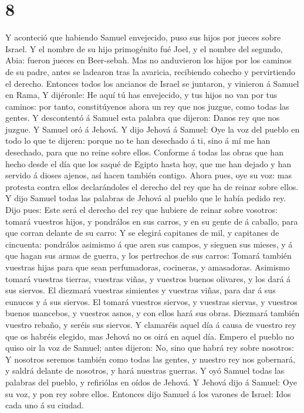 \hypertarget{section-7}{%
\section{8}\label{section-7}}

 Y aconteció que habiendo Samuel envejecido, puso sus
hijos por jueces sobre Israel.  Y el nombre de su hijo
primogénito fué Joel, y el nombre del segundo, Abia: fueron jueces en
Beer-sebah.  Mas no anduvieron los hijos por los caminos
de su padre, antes se ladearon tras la avaricia, recibiendo cohecho y
pervirtiendo el derecho.  Entonces todos los ancianos de
Israel se juntaron, y vinieron á Samuel en Rama,  Y
dijéronle: He aquí tú has envejecido, y tus hijos no van por tus
caminos: por tanto, constitúyenos ahora un rey que nos juzgue, como
todas las gentes.  Y descontentó á Samuel esta palabra que
dijeron: Danos rey que nos juzgue. Y Samuel oró á Jehová. 
Y dijo Jehová á Samuel: Oye la voz del pueblo en todo lo que te dijeren:
porque no te han desechado á ti, sino á mí me han desechado, para que no
reine sobre ellos.  Conforme á todas las obras que han
hecho desde el día que los saqué de Egipto hasta hoy, que me han dejado
y han servido á dioses ajenos, así hacen también contigo. 
Ahora pues, oye su voz: mas protesta contra ellos declarándoles el
derecho del rey que ha de reinar sobre ellos.  Y dijo
Samuel todas las palabras de Jehová al pueblo que le había pedido rey.
 Dijo pues: Este será el derecho del rey que hubiere de
reinar sobre vosotros: tomará vuestros hijos, y pondrálos en sus carros,
y en su gente de á caballo, para que corran delante de su carro:
 Y se elegirá capitanes de mil, y capitanes de cincuenta:
pondrálos asimismo á que aren sus campos, y sieguen sus mieses, y á que
hagan sus armas de guerra, y los pertrechos de sus carros:
 Tomará también vuestras hijas para que sean
perfumadoras, cocineras, y amasadoras.  Asimismo tomará
vuestras tierras, vuestras viñas, y vuestros buenos olivares, y los dará
á sus siervos.  El diezmará vuestras simientes y vuestras
viñas, para dar á sus eunucos y á sus siervos.  El tomará
vuestros siervos, y vuestras siervas, y vuestros buenos mancebos, y
vuestros asnos, y con ellos hará sus obras.  Diezmará
también vuestro rebaño, y seréis sus siervos.  Y
clamaréis aquel día á causa de vuestro rey que os habréis elegido, mas
Jehová no os oirá en aquel día.  Empero el pueblo no
quiso oir la voz de Samuel; antes dijeron: No, sino que habrá rey sobre
nosotros:  Y nosotros seremos también como todas las
gentes, y nuestro rey nos gobernará, y saldrá delante de nosotros, y
hará nuestras guerras.  Y oyó Samuel todas las palabras
del pueblo, y refiriólas en oídos de Jehová.  Y Jehová
dijo á Samuel: Oye su voz, y pon rey sobre ellos. Entonces dijo Samuel á
los varones de Israel: Idos cada uno á su ciudad.

